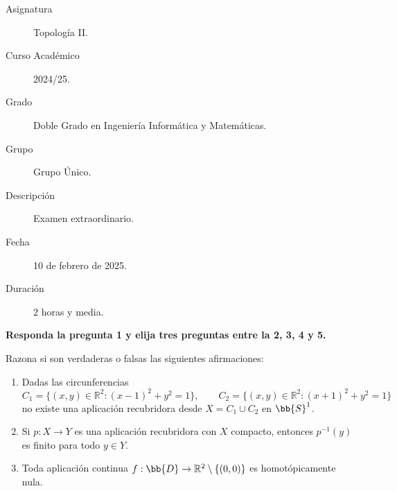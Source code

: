 \documentclass[12pt]{article}
\begin{document}

    
    

    \begin{description}
        \item[Asignatura] Topología II.
        \item[Curso Académico] 2024/25.
        \item[Grado] Doble Grado en Ingeniería Informática y Matemáticas.
        \item[Grupo] Grupo Único.
        \item[Descripción] Examen extraordinario.
        \item[Fecha] 10 de febrero de 2025.
        \item[Duración] 2 horas y media.
    \end{description}
    \newpage


    
    \noindent
    \textbf{Responda la pregunta 1 y elija tres preguntas entre la 2, 3, 4 y 5.}

    \begin{ejercicio}
        Razona si son verdaderas o falsas las siguientes afirmaciones:
        \begin{enumerate}[label=\alph*)]
            \item Dadas las circunferencias
                \begin{equation*}
                    C_1 = \{(x,y)\in \mathbb{R}^2 : {(x-1)}^{2}+y^2 = 1\}, \qquad C_2 = \{(x,y)\in \mathbb{R}^2 : {(x+1)}^{2}+y^2 = 1\}
                \end{equation*}
                no existe una aplicación recubridora desde $X=C_1\cup C_2$ en $\bb{S}^1$.
            \item Si $p:X\to Y$ es una aplicación recubridora con $X$ compacto, entonces $p^{-1}(y)$ es finito para todo $y\in Y$.
            \item Toda aplicación continua $f:\bb{D}\to \mathbb{R}^2\setminus \{(0,0)\}$ es homotópicamente nula.
        \end{enumerate}
    \end{ejercicio}
\end{document}
